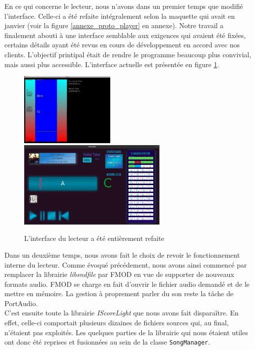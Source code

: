 \documentclass[a4paper,11pt]{article}
\begin{document}
En ce qui concerne le lecteur, nous n'avons dans un premier temps que modifié l'interface. Celle-ci a été refaite intégralement selon la maquette qui avait en janvier (voir la figure \ref{annexe_proto_player} en annexe). Notre travail a finalement abouti à une interface semblable aux exigences qui avaient été fixées, certains détails ayant été revus en cours de développement en accord avec nos clients. L'objectif printipal était de rendre le programme beaucoup plus convivial, mais aussi plus accessible. L'interface actuelle est présentée en figure \ref{interface_player}.

\begin{figure}[!ht]
\begin{center}
\includegraphics[width=175px]{ancien_player.png}
\includegraphics[width=275px]{interface_player.png}
\caption{L'interface du lecteur a été entièrement refaite}
\label{interface_player}
\end{center}
\end{figure}

Dans un deuxième temps, nous avons fait le choix de revoir le fonctionnement interne du lecteur. Comme évoqué précédement, nous avons ainsi commencé par remplacer la librairie \textit{libsndfile} par FMOD en vue de supporter de nouveaux formats audio. FMOD se charge en fait d'ouvrir le fichier audio demandé et de le mettre en mémoire. La gestion à proprement parler du son reste la tâche de PortAudio.\\

C'est ensuite toute la librairie \textit{IScoreLight} que nous avons fait disparaître. En effet, celle-ci comportait plusieurs dizaines de fichiers sources qui, au final, n'étaient pas exploités. Les quelques parties de la librairie qui nous étaient utiles ont donc été reprises et fusionnées au sein de la classe \texttt{SongManager}.\\
\end{document}
